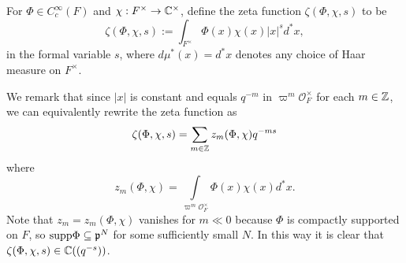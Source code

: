 \begin{defn}
    For $\Phi \in C_c^\infty(F)$ and $\chi :F^\times \to \mathbb{C}^\times$, define the zeta function $\zeta(\Phi,\chi,s)$ to be
    $$\zeta(\Phi,\chi,s) := \int_{F^\times} \Phi(x)\chi(x)|x|^s d^*x,$$ in the formal variable $s$, where $d\mu^*(x) = d^*x$ denotes any choice of Haar measure on $F^\times$.
\end{defn}

We remark that since $|x|$ is constant and equals $q^{-m}$ in $\varpi^m\mathcal{O}_F^\times$ for each $m\in\mathbb{Z}$, we can equivalently rewrite the zeta function as
$$\zeta(\Phi,\chi,s) = \sum\limits_{m \in \mathbb{Z}} z_m(\Phi,\chi) q^{-ms}$$
where $$z_m(\Phi,\chi) = \int\limits_{\varpi^m \mathcal O_F^\times} \Phi(x)\chi(x)d^*x.$$ 
Note that $z_m=z_m(\Phi,\chi)$ vanishes for $m \ll0$ because $\Phi$ is compactly supported on $F$, so $\mathrm{supp}\Phi\subseteq\mathfrak{p}^N$ for some sufficiently small $N$. In this way it is clear that $\zeta(\Phi,\chi,s) \in \mathbb{C}((q^{-s}))$. 

